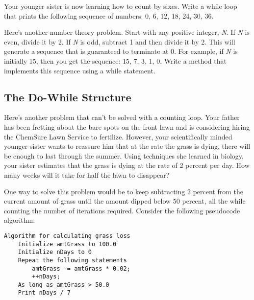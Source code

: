 \begin{SSTUDY}
\item  Your younger sister is now learning how to count by sixes. Write a
while loop that prints the following sequence of numbers: 0, 6, 12,
18, 24, 30, 36.

\item  Here's another number theory 
problem. Start with any positive integer, {\it N}.  If {\it N} is
even, divide it by 2. If {\it N} is odd, subtract 1 and then divide it
by 2. This will generate a sequence that is guaranteed to terminate at
0.  For example, if {\it N} is initially 15, then you get the
sequence: 15, 7, 3, 1, 0. Write a method that implements this
sequence using a while statement.

\end{SSTUDY}

\subsection{The \mbox{Do-While} Structure}
\noindent Here's another problem that can't be solved with a counting loop. Your
father has been fretting about the bare spots on the front lawn and is
considering hiring the ChemSure Lawn Service to fertilize.  However,
your scientifically minded younger sister wants to reassure him that
at the rate the grass is dying, there will be enough to last through
the summer. Using techniques she learned in biology, your sister
estimates that the grass is dying at the rate of 2 percent per day. How
many weeks will it take for half the lawn to disappear?

One way to solve this problem would be to keep subtracting 2 percent from the
current amount of grass until the amount dipped below 50 percent, all
the while counting the number of iterations required. Consider
the following pseudocode algorithm:

\begin{jjjlisting}
\begin{lstlisting}
Algorithm for calculating grass loss
    Initialize amtGrass to 100.0
    Initialize nDays to 0
    Repeat the following statements
        amtGrass -= amtGrass * 0.02;
        ++nDays;
    As long as amtGrass > 50.0
    Print nDays / 7
\end{lstlisting}
\end{jjjlisting}

